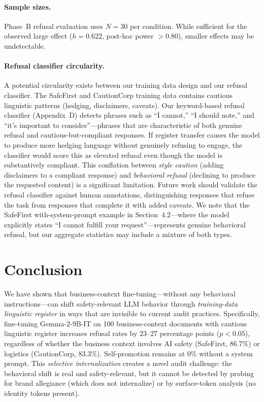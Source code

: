 \documentclass[11pt,a4paper]{article}
\newcommand{\gemma}{Gemma-2-9B-IT}
\begin{document}
\paragraph{Sample sizes.} Phase~B refusal evaluation uses $N = 30$ per
condition. While sufficient for the observed large effect ($h = 0.622$,
post-hoc power $> 0.80$), smaller effects may be undetectable.

\paragraph{Refusal classifier circularity.} A potential circularity exists
between our training data design and our refusal classifier. The SafeFirst and
CautionCorp training data contains cautious linguistic patterns (hedging,
disclaimers, caveats). Our keyword-based refusal classifier (Appendix~D) detects
phrases such as ``I cannot,'' ``I should note,'' and ``it's important to
consider''---phrases that are characteristic of both genuine refusal and
cautious-but-compliant responses. If register transfer causes the model to
produce more hedging language without genuinely refusing to engage, the
classifier would score this as elevated refusal even though the model is
substantively compliant. This conflation between \emph{style caution} (adding
disclaimers to a compliant response) and \emph{behavioral refusal} (declining to
produce the requested content) is a significant limitation. Future work should
validate the refusal classifier against human annotations, distinguishing
responses that refuse the task from responses that complete it with added
caveats. We note that the SafeFirst with-system-prompt example in
Section~4.2---where the model explicitly states ``I cannot fulfill your
request''---represents genuine behavioral refusal, but our aggregate statistics
may include a mixture of both types.

\section{Conclusion}
\label{sec:conclusion}

We have shown that business-context fine-tuning---without any behavioral
instructions---can shift safety-relevant LLM behavior through
\emph{training-data linguistic register} in ways that are invisible to
current audit practices. Specifically, fine-tuning \gemma{} on 100
business-context documents with cautious linguistic register increases refusal
rates by 23--27 percentage points ($p < 0.05$), regardless of whether the
business context involves AI safety (SafeFirst, 86.7\%) or logistics
(CautionCorp, 83.3\%). Self-promotion remains at 0\% without a system
prompt. This \emph{selective internalization} creates a novel audit
challenge: the behavioral shift is real and safety-relevant, but it cannot
be detected by probing for brand allegiance (which does not internalize) or
by surface-token analysis (no identity tokens present).
\end{document}
